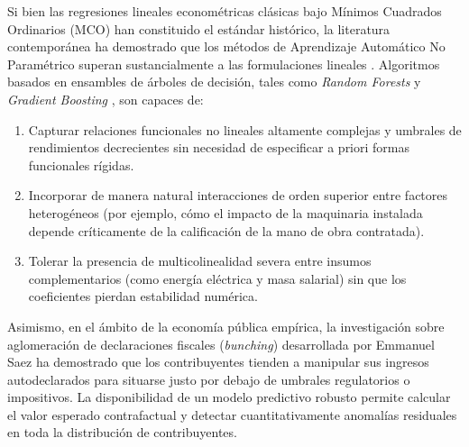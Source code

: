 Si bien las regresiones lineales econométricas clásicas bajo Mínimos Cuadrados Ordinarios (MCO) han constituido el estándar histórico, la literatura contemporánea ha demostrado que los métodos de Aprendizaje Automático No Paramétrico superan sustancialmente a las formulaciones lineales \citep{hastie2009elements}. Algoritmos basados en ensambles de árboles de decisión, tales como \textit{Random Forests} \citep{breiman2001random} y \textit{Gradient Boosting} \citep{chen2016xgboost}, son capaces de:
\begin{enumerate}
    \item Capturar relaciones funcionales no lineales altamente complejas y umbrales de rendimientos decrecientes sin necesidad de especificar a priori formas funcionales rígidas.
    \item Incorporar de manera natural interacciones de orden superior entre factores heterogéneos (por ejemplo, cómo el impacto de la maquinaria instalada depende críticamente de la calificación de la mano de obra contratada).
    \item Tolerar la presencia de multicolinealidad severa entre insumos complementarios (como energía eléctrica y masa salarial) sin que los coeficientes pierdan estabilidad numérica.
\end{enumerate}

Asimismo, en el ámbito de la economía pública empírica, la investigación sobre aglomeración de declaraciones fiscales (\textit{bunching}) desarrollada por Emmanuel Saez \citep{saez2010bunching} ha demostrado que los contribuyentes tienden a manipular sus ingresos autodeclarados para situarse justo por debajo de umbrales regulatorios o impositivos. La disponibilidad de un modelo predictivo robusto permite calcular el valor esperado contrafactual y detectar cuantitativamente anomalías residuales en toda la distribución de contribuyentes.
